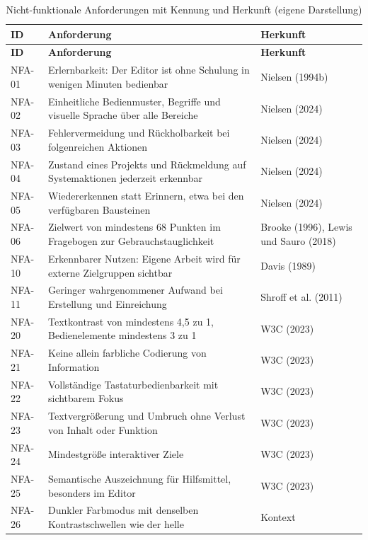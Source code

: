 \begingroup
\small
\setlength{\tabcolsep}{4pt}
\setlength{\LTcapwidth}{\textwidth}
\begin{longtable}{@{}L{1.7cm}L{9.0cm}L{3.8cm}@{}}
	\caption[Nicht-funktionale Anforderungen mit Kennung und Herkunft]{Nicht-funktionale Anforderungen mit Kennung und Herkunft (eigene Darstellung)}
	\label{tab:nfa}\\
	\toprule
	\textbf{ID} & \textbf{Anforderung} & \textbf{Herkunft} \\
	\midrule
	\endfirsthead
	\toprule
	\textbf{ID} & \textbf{Anforderung} & \textbf{Herkunft} \\
	\midrule
	\endhead
	\bottomrule
	\endfoot
	NFA-01 & Erlernbarkeit: Der Editor ist ohne Schulung in wenigen Minuten bedienbar & Nielsen (1994b) \\
	NFA-02 & Einheitliche Bedienmuster, Begriffe und visuelle Sprache über alle Bereiche & Nielsen (2024) \\
	NFA-03 & Fehlervermeidung und Rückholbarkeit bei folgenreichen Aktionen & Nielsen (2024) \\
	NFA-04 & Zustand eines Projekts und Rückmeldung auf Systemaktionen jederzeit erkennbar & Nielsen (2024) \\
	NFA-05 & Wiedererkennen statt Erinnern, etwa bei den verfügbaren Bausteinen & Nielsen (2024) \\
	NFA-06 & Zielwert von mindestens 68 Punkten im Fragebogen zur Gebrauchstauglichkeit & Brooke (1996), Lewis und Sauro (2018) \\
	NFA-10 & Erkennbarer Nutzen: Eigene Arbeit wird für externe Zielgruppen sichtbar & Davis (1989) \\
	NFA-11 & Geringer wahrgenommener Aufwand bei Erstellung und Einreichung & Shroff et al. (2011) \\
	NFA-20 & Textkontrast von mindestens 4,5 zu 1, Bedienelemente mindestens 3 zu 1 & W3C (2023) \\
	NFA-21 & Keine allein farbliche Codierung von Information & W3C (2023) \\
	NFA-22 & Vollständige Tastaturbedienbarkeit mit sichtbarem Fokus & W3C (2023) \\
	NFA-23 & Textvergrößerung und Umbruch ohne Verlust von Inhalt oder Funktion & W3C (2023) \\
	NFA-24 & Mindestgröße interaktiver Ziele & W3C (2023) \\
	NFA-25 & Semantische Auszeichnung für Hilfsmittel, besonders im Editor & W3C (2023) \\
	NFA-26 & Dunkler Farbmodus mit denselben Kontrastschwellen wie der helle & Kontext \\

\end{longtable}

